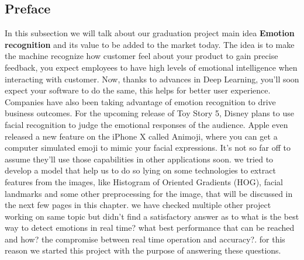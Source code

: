 \subsection{Preface}

In this subsection we will talk about our graduation project main idea
\textbf{Emotion recognition} and its value to be added to the market today.
\newline
The idea is to make the machine recognize how customer feel about your product to gain precise feedback, you expect employees to have high levels of emotional intelligence when interacting with customer. Now, thanks to advances in Deep Learning, you’ll soon expect your software to do the same, this helps for better user experience.
\bigbreak
Companies have also been taking advantage of emotion recognition to drive business outcomes. For the upcoming release of Toy Story 5, Disney plans to use facial recognition to judge the emotional responses of the audience. Apple even released a new feature on the iPhone X called Animoji, where you can get a computer simulated emoji to mimic your facial expressions. It’s not so far off to assume they’ll use those capabilities in other applications soon.
\bigbreak
we tried to develop a model that help us to do so lying on some technologies to extract features from the images, like Histogram of Oriented Gradients (HOG), facial landmarks and some other preprocessing for the image, that will be discussed in the next few pages in this chapter.\newline
we have checked multiple other project working on same topic but didn't find a satisfactory answer as to what is the best way to detect emotions in real time? what best performance that can be reached and how? the compromise between real time operation and accuracy?.
for this reason we started this project with the purpose of answering these questions.


